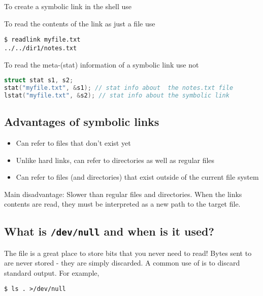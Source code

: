 To create a symbolic link in the shell use 

To read the contents of the link as just a file use 

\begin{lstlisting}
$ readlink myfile.txt
../../dir1/notes.txt
\end{lstlisting}

To read the meta-(stat) information of a symbolic link use  not 

\begin{lstlisting}[language=C]
struct stat s1, s2;
stat("myfile.txt", &s1); // stat info about  the notes.txt file
lstat("myfile.txt", &s2); // stat info about the symbolic link
\end{lstlisting}

\subsection{Advantages of symbolic links}\label{advantages-of-symbolic-links}

\begin{itemize}
\tightlist
\item
  Can refer to files that don't exist yet
\item
  Unlike hard links, can refer to directories as well as regular files
\item
  Can refer to files (and directories) that exist outside of the current file system
\end{itemize}

Main disadvantage: Slower than regular files and directories. When the links contents are read, they must be interpreted as a new path to the target file.

\subsection{\texorpdfstring{What is \texttt{/dev/null} and when is it used?}{What is /dev/null and when is it used?}}\label{what-is-devnull-and-when-is-it-used}

The file  is a great place to store bits that you never need to read! Bytes sent to  are never stored - they are simply discarded. A common use of  is to discard standard output. For example,

\begin{lstlisting}
$ ls . >/dev/null
\end{lstlisting}

